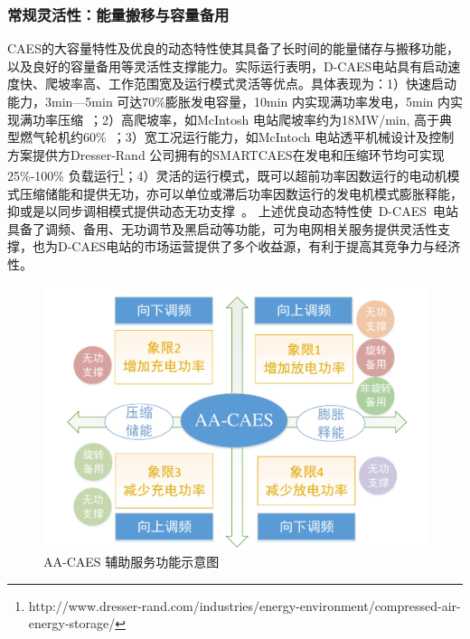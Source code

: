 \subsubsection{常规灵活性：能量搬移与容量备用}
CAES的大容量特性及优良的动态特性使其具备了长时间的能量储存与搬移功能，以及良好的容量备用等灵活性支撑能力。实际运行表明，D-CAES电站具有启动速度快、爬坡率高、工作范围宽及运行模式灵活等优点\cite{CAES-Review-18-Rui-operation}。具体表现为：1）快速启动能力，3min—5min 可达70\%膨胀发电容量，10min 内实现满功率发电，5min 内实现满功率压缩~\cite{Huntorf-20-01}；2）高爬坡率，如McIntosh 电站爬坡率约为18MW/min, 高于典型燃气轮机约60\%~\cite{CAES-Alabama-06}；3）宽工况运行能力，如McIntoch 电站透平机械设计及控制方案提供方Dresser-Rand 公司拥有的SMARTCAES在发电和压缩环节均可实现25\%-100\% 负载运行\footnote{http://www.dresser-rand.com/industries/energy-environment/compressed-air-energy-storage/}；4）灵活的运行模式，既可以超前功率因数运行的电动机模式压缩储能和提供无功，亦可以单位或滞后功率因数运行的发电机模式膨胀释能，抑或是以同步调相模式提供动态无功支撑~\cite{CAES-Reactive-13,CAES-Reactive-18-LGK}。 上述优良动态特性使~D-CAES~电站具备了调频、备用、无功调节及黑启动等功能，可为电网相关服务提供灵活性支撑，也为D-CAES电站的市场运营提供了多个收益源，有利于提高其竞争力与经济性\cite{CAES-Review-18-Rui-operation}。

\begin{figure}[htp] %
  \centering
  \includegraphics[scale=0.60]{figures/Chap1-2-CAES-AS-Overview-2.pdf}
  \caption{AA-CAES 辅助服务功能示意图}
  \label{fig:CAES-AS-Overview}
\end{figure}

